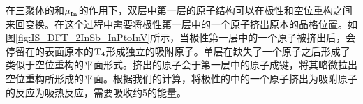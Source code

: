 在三聚体的和$\it \mu_{\rm In}^{\rm } \it$的作用下，双层中第一层的原子结构可以在极性和空位重构之间来回变换。在这个过程中需要将极性第一层中的一个原子挤出原本的晶格位置。如图\ref{fig:IS_DFT_2InSb_InPtoInV}所示，当极性第一层中的一个原子被挤出后，会停留在的表面原本的$\rm T_{4} \it$形成独立的吸附原子。单层在缺失了一个原子之后形成了类似于空位重构的平面形式。挤出的原子会于第一层中的原子成键，将其略微拉出空位重构所形成的平面。根据我们的计算，将极性的中的一个原子挤出为吸附原子的反应为吸热反应，需要吸收约\SI{5}{\mievpas}的能量。

\begin{figure}[htb]
    \begin{minipage}[b]{0.4\textwidth}
\end{minipage}
\end{figure}
